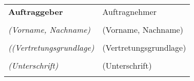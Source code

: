 
\mbox{}\vfill %
\begin{tabu}{X X} \tabucline{}
	\rowfont[c]\bfseries Auftraggeber & Auftragnehmer \\
	[10pt]\makebox[8cm]{\hrulefill} & \makebox[8cm]{\hrulefill} \\
	\rowfont[c]\itshape (Vorname, Nachname) & (Vorname, Nachname) \\
	[10pt]\makebox[8cm]{\hrulefill} & \makebox[8cm]{\hrulefill} \\
	\rowfont[c]\itshape ((Vertretungsgrundlage) & (Vertretungsgrundlage) \\
	[10pt]\makebox[8cm]{\hrulefill} & \makebox[8cm]{\hrulefill} \\
	\rowfont[c]\itshape (Unterschrift) & (Unterschrift) \\[4cm] \\
\end{tabu}
\pagebreak
